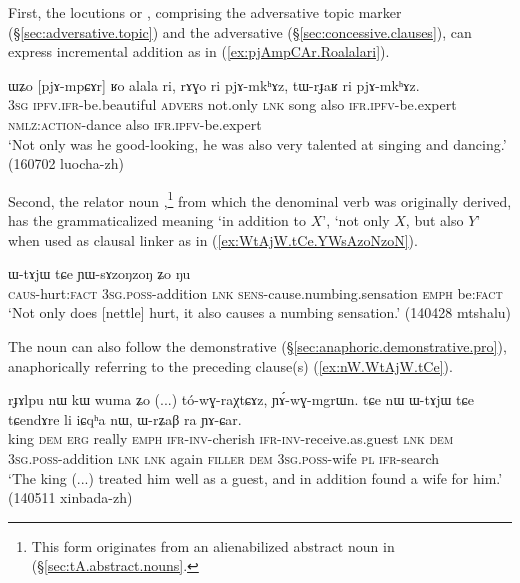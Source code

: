 First, the locutions  or , comprising the adversative topic marker  (§\ref{sec:adversative.topic}) and the adversative  (§\ref{sec:concessive.clauses}), can express incremental addition as in (\ref{ex:pjAmpCAr.Roalalari}).

\begin{exe}
\ex \label{ex:pjAmpCAr.Roalalari}
\gll ɯʑo [pjɤ-mpɕɤr] ʁo alala ri, rɤɣo ri pjɤ-mkʰɤz, tɯ-rɟaʁ ri pjɤ-mkʰɤz. \\
\textsc{3sg} \textsc{ipfv}.\textsc{ifr}-be.beautiful \textsc{advers} not.only \textsc{lnk} song also \textsc{ifr}.\textsc{ipfv}-be.expert \textsc{nmlz}:\textsc{action}-dance also \textsc{ifr}.\textsc{ipfv}-be.expert  \\
\glt `Not only was he good-looking, he was also very talented at singing and dancing.' (160702 luocha-zh)
\end{exe}

Second, the relator noun ,\footnote{This form originates from an alienabilized abstract noun in  (§\ref{sec:tA.abstract.nouns}.} from which the denominal verb  was originally derived, has the grammaticalized meaning `in addition to $X$', `not only $X$, but also $Y$' when used as clausal linker as in (\ref{ex:WtAjW.tCe.YWsAzoNzoN}).

\begin{exe}
\ex \label{ex:WtAjW.tCe.YWsAzoNzoN}
\gll  [ɕɯ-mŋɤm] ɯ-tɤjɯ tɕe ɲɯ-sɤzoŋzoŋ ʑo ŋu \\
\textsc{caus}-hurt:\textsc{fact} \textsc{3sg}.\textsc{poss}-addition \textsc{lnk} \textsc{sens}-cause.numbing.sensation \textsc{emph} be:\textsc{fact} \\
\glt `Not only does [nettle] hurt, it also causes a numbing sensation.' (140428 mtshalu)
\end{exe}

The noun  can also follow the demonstrative  (§\ref{sec:anaphoric.demonstrative.pro}), anaphorically referring to the preceding clause(s) (\ref{ex:nW.WtAjW.tCe}).

\begin{exe}
\ex \label{ex:nW.WtAjW.tCe}
\gll  rɟɤlpu nɯ kɯ wuma ʑo (...) tó-wɣ-raχtɕɤz, ɲɤ́-wɣ-mgrɯn. tɕe nɯ ɯ-tɤjɯ tɕe tɕendɤre li iɕqʰa nɯ, ɯ-rʑaβ ra ɲɤ-ɕar. \\
king \textsc{dem} \textsc{erg} really \textsc{emph} {  } \textsc{ifr}-\textsc{inv}-cherish \textsc{ifr}-\textsc{inv}-receive.as.guest \textsc{lnk} \textsc{dem} \textsc{3sg}.\textsc{poss}-addition \textsc{lnk} \textsc{lnk} again \textsc{filler} \textsc{dem} \textsc{3sg}.\textsc{poss}-wife \textsc{pl} \textsc{ifr}-search \\
\glt `The king (...) treated him well as a guest, and in addition found a wife for him.' (140511 xinbada-zh)
\end{exe}

